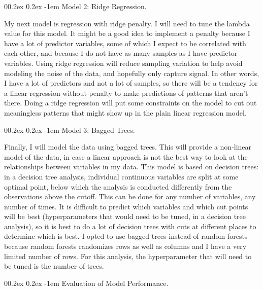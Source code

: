 \documentclass[
  man,floatsintext]{apa6}
\makeatletter
\let\oldparagraph\paragraph
\renewcommand{\paragraph}[1]{\oldparagraph{#1}\mbox{}}
\renewcommand{\paragraph}{\@startsection{paragraph}{4}{\parindent}%
  {0\baselineskip \@plus 0.2ex \@minus 0.2ex}%
  {-1em}%
  {\normalfont\normalsize\bfseries\itshape\typesectitle}}
\makeatother
\begin{document}
\hypertarget{model-2-ridge-regression.}{%
\paragraph{Model 2: Ridge Regression.}\label{model-2-ridge-regression.}}

My next model is regression with ridge penalty. I will need to tune the lambda value for this model. It might be a good idea to implement a penalty because I have a lot of predictor variables, some of which I expect to be correlated with each other, and because I do not have as many samples as I have predictor variables. Using ridge regression will reduce sampling variation to help avoid modeling the noise of the data, and hopefully only capture signal. In other words, I have a lot of predictors and not a lot of samples, so there will be a tendency for a linear regression without penalty to make predictions of patterns that aren't there. Doing a ridge regression will put some constraints on the model to cut out meaningless patterns that might show up in the plain linear regression model.

\hypertarget{model-3-bagged-trees.}{%
\paragraph{Model 3: Bagged Trees.}\label{model-3-bagged-trees.}}

Finally, I will model the data using bagged trees. This will provide a non-linear model of the data, in case a linear approach is not the best way to look at the relationships between variables in my data. This model is based on decision trees: in a decision tree analysis, individual continuous variables are split at some optimal point, below which the analysis is conducted differently from the observations above the cutoff. This can be done for any number of variables, any number of times. It is difficult to predict which variables and which cut points will be best (hyperparameters that would need to be tuned, in a decision tree analysis), so it is best to do a lot of decision trees with cuts at different places to determine which is best. I opted to use bagged trees instead of random forests because random forests randomizes rows as well as columns and I have a very limited number of rows. For this analysis, the hyperparameter that will need to be tuned is the number of trees.

\hypertarget{evaluation-of-model-performance.}{%
\paragraph{Evaluation of Model Performance.}\label{evaluation-of-model-performance.}}
\end{document}
